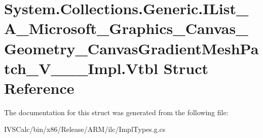 \hypertarget{struct_system_1_1_collections_1_1_generic_1_1_i_list___a___microsoft___graphics___canvas___geomef11c0225d6851bd3d461b0467e7739d6}{}\section{System.\+Collections.\+Generic.\+I\+List\+\_\+\+A\+\_\+\+Microsoft\+\_\+\+Graphics\+\_\+\+Canvas\+\_\+\+Geometry\+\_\+\+Canvas\+Gradient\+Mesh\+Patch\+\_\+\+V\+\_\+\+\_\+\+\_\+\+Impl.\+Vtbl Struct Reference}
\label{struct_system_1_1_collections_1_1_generic_1_1_i_list___a___microsoft___graphics___canvas___geomef11c0225d6851bd3d461b0467e7739d6}


The documentation for this struct was generated from the following file\+:\begin{DoxyCompactItemize}
\item 
I\+V\+S\+Calc/bin/x86/\+Release/\+A\+R\+M/ilc/Impl\+Types.\+g.\+cs\end{DoxyCompactItemize}
